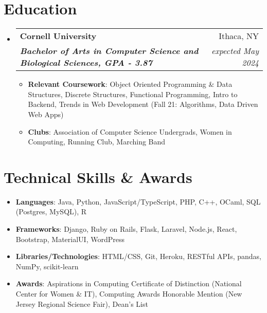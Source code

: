\documentclass[letterpaper,11pt]{article}
\makeatletter
\newcommand{\resumeItem}[1]{
  \item\small{
    {#1 \vspace{-2pt}}
  }
}
\newcommand{\resumeSubheading}[4]{
  \vspace{-2pt}\item
    \begin{tabular*}{0.99\textwidth}[t]{l@{\extracolsep{\fill}}r}
      \textbf{\montserrat #1} & {\montserrat #2} \\
      \textit{\textbf{\small#3}} & \textit{ \small #4} \\
    \end{tabular*}\vspace{-8pt}
}
\newcommand{\resumeSkillItem}[1]{
\item\small{
    {#1 \vspace{-7pt}}
  }
}
\newcommand{\resumeSubHeadingListStart}{\begin{itemize}[leftmargin=0.02in, label={}]}
\newcommand{\resumeSubHeadingListEnd}{\end{itemize}}
\newcommand{\resumeItemListStart}{\begin{itemize} [leftmargin=0.25in]}
\newcommand{\resumeItemListEnd}{\end{itemize}\vspace{-5pt}}
\makeatother
\begin{document}
\section{Education}
  \resumeSubHeadingListStart
  \resumeSubheading
      {Cornell University}{Ithaca, NY}
      {Bachelor of Arts in Computer Science and Biological Sciences, GPA - 3.87}{expected May 2024}
      \resumeItemListStart
      	\resumeItem {\textbf{\montserrat Relevant Coursework}: Object Oriented Programming \& Data Structures, Discrete Structures, Functional Programming, Intro to Backend, Trends in Web Development (Fall 21: Algorithms, Data Driven Web Apps)}
        \resumeItem {\textbf{\montserrat Clubs}: Association of Computer Science Undergrads, Women in Computing, Running Club, Marching Band}
       \resumeItemListEnd
  \resumeSubHeadingListEnd
  
\section{Technical Skills \& Awards}
 \resumeSubHeadingListStart
    \resumeSkillItem{
    \textbf{\montserrat Languages}{: Java, Python, JavaScript/TypeScript, PHP, C++, OCaml, SQL (Postgres, MySQL), R}}
    
    \resumeSkillItem{
     \textbf{\montserrat Frameworks}{: Django, Ruby on Rails, Flask, Laravel, Node.js, React, Bootstrap, MaterialUI, WordPress}}
    
    \resumeSkillItem{
     \textbf{\montserrat Libraries/Technologies}{: HTML/CSS, Git, Heroku, RESTful APIs, pandas, NumPy, scikit-learn}}
    
    \resumeSkillItem{
     \textbf{\montserrat Awards}{: Aspirations in Computing Certificate of Distinction (National Center for Women \& IT),
     Computing Awards Honorable Mention (New Jersey Regional Science Fair), Dean's List}}
 \resumeItemListEnd
\end{document}
